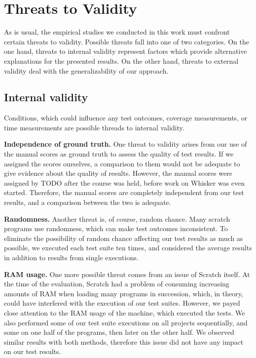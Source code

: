 \section{Threats to Validity}
\label{sec:threats_to_validity}

As is usual, the empirical studies we conducted in this work must confront certain threats to validity.
Possible threats fall into one of two categories.
On the one hand, threats to internal validity represent factors which provide alternative explanations for the presented results.
On the other hand, threats to external validity deal with the generalizability of our approach.

\subsection{Internal validity}

Conditions, which could influence any test outcomes, coverage measurements,
or time measurements are possible threads to internal validity.
\parspace

\textbf{Independence of ground truth.}
One threat to validity arises from our use of the manual scores as
ground truth to assess the quality of test results.
If we assigned the scores ourselves,
a comparison to them would not be adequate to give evidence about the quality of results.
However, the manual scores were assigned by TODO after the course was held,
before work on Whisker was even started.
Therefore, the manual scores are completely independent from our test results,
and a comparison between the two is adequate.
\parspace

\textbf{Randomness.}
Another threat is, of course, random chance.
Many scratch programs use randomness, which can make test outcomes inconsistent.
To eliminate the possibility of random chance affecting our test results as much as possible, we executed each test suite ten times,
and considered the average results in addition to results from single executions.
\parspace

\textbf{RAM usage.}
One more possible threat comes from an issue of Scratch itself.
At the time of the evaluation, Scratch had a problem of consuming increasing amounts of RAM when loading many programs in succession,
which, in theory, could have interfered with the execution of our test suites.
However, we payed close attention to the RAM usage of the machine, which executed the tests.
We also performed some of our test suite executions on all projects sequentially,
and some on one half of the programs, then later on the other half.
We observed similar results with both methods, therefore this issue did not have any impact on our test results.
\parspace

